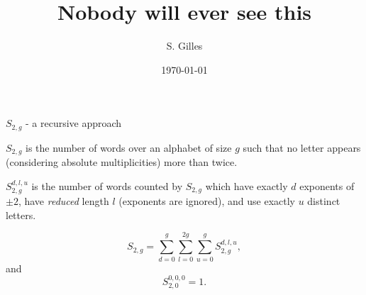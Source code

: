 \documentclass{beamer}
\title{Nobody will ever see this}
\author{S. Gilles}
\institute{University of Maryland}
\date{\today}
\theoremstyle{definition}
\begin{document}

\begin{frame}{$S_{2,g}$ - a recursive approach}

  \begin{definition}
    $S_{2,g}$ is the number of words over an alphabet of size $g$ such
    that no letter appears (considering absolute multiplicities) more
    than twice.
  \end{definition}

  \pause

  \begin{definition}
    $S_{2,g}^{d,l,u}$ is the number of words counted by $S_{2,g}$
    which have exactly $d$ exponents of $\pm 2$, have \emph{reduced}
    length $l$ (exponents are ignored), and use exactly $u$ distinct
    letters.
  \end{definition}

  \pause

  \[S_{2,g} = \sum_{d=0}^{g} \sum_{l=0}^{2g} \sum_{u=0}^{g}
    S_{2,g}^{d,l,u}, \]
  and
  \[ S_{2,0}^{0,0,0} = 1. \]


\end{frame}
\end{document}
